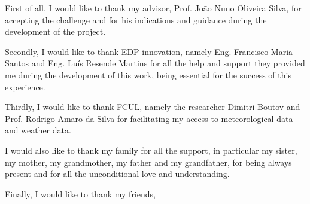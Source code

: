 
First of all, I would like to thank my advisor, Prof. João Nuno Oliveira Silva, for accepting the challenge and for his indications and guidance during the development of the project. 

Secondly, I would like to thank EDP innovation, namely Eng. Francisco Maria Santos and Eng. Luís Resende Martins for all the help and support they provided me during the development of this work, being essential for the success of this experience.

Thirdly, I would like to thank FCUL, namely the researcher Dimitri Boutov and Prof. Rodrigo Amaro da Silva for facilitating my access to meteorological data and weather data.

I would also like to thank my family for all the support, in particular my sister, my mother, my grandmother, my father and my grandfather, for being always present and for all the unconditional love and understanding.

Finally, I would like to thank my friends, 